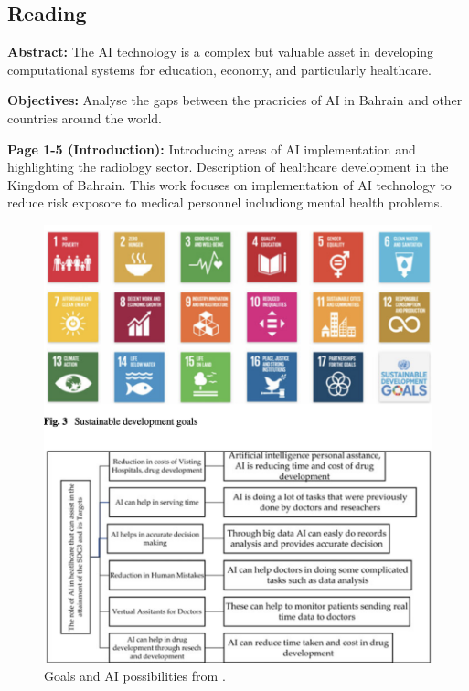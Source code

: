 \subsection{Reading}
    \textbf{Abstract:}
    The AI technology is a complex but valuable asset in developing computational systems for education, economy, and particularly healthcare.
    
    \textbf{Objectives:}
    Analyse the gaps between the pracricies of AI in Bahrain and other countries around the world.

    \textbf{Page 1-5 (Introduction):}
    Introducing areas of AI implementation and highlighting the radiology sector. Description of healthcare development in the Kingdom of Bahrain. This work focuses on implementation of AI technology to reduce risk exposore to medical personnel includiong mental health problems. 
    \begin{figure}[H]
        \centering
        \includegraphics[width=1\textwidth]{figures/SR0023US23/fig2.png}
        \caption{Goals and AI possibilities from \cite{x101}.}
        \label{fig2:SR0023US23}
    \end{figure}

